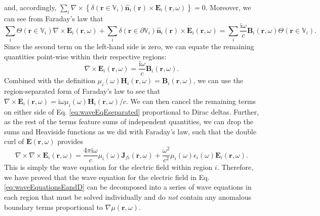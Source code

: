 \documentclass{article}
\begin{document}
and, accordingly, $\sum_i\nabla\times\left\{\delta(\mathbf{r}\in\mathbb{V}_i)\hat{\mathbf{n}}_i(\mathbf{r})\times\mathbf{E}_i(\mathbf{r},\omega)\right\} = 0$. Moreover, we can see from Faraday's law that
\begin{equation}
\sum_i\Theta(\mathbf{r}\in\mathbb{V}_i)\nabla\times\mathbf{E}_i(\mathbf{r},\omega) + \sum_i\delta(\mathbf{r}\in\partial\mathbb{V}_i)\hat{\mathbf{n}}_i(\mathbf{r})\times\mathbf{E}_i(\mathbf{r},\omega) = \sum_i\frac{\mathrm{i}\omega}{c}\mathbf{B}_i(\mathbf{r},\omega)\Theta(\mathbf{r}\in\mathbb{V}_i).
\end{equation}
Since the second term on the left-hand side is zero, we can equate the remaining quantities point-wise within their respective regions:
\begin{equation}
\nabla\times\mathbf{E}_i(\mathbf{r},\omega) = \frac{\mathrm{i}\omega}{c}\mathbf{B}_i(\mathbf{r},\omega).
\end{equation}
\sloppy Combined with the definition $\mu_i(\omega)\mathbf{H}_i(\mathbf{r},\omega) = \mathbf{B}_i(\mathbf{r},\omega)$, we can use the region-separated form of Faraday's law to see that $\nabla\times\mathbf{E}_i(\mathbf{r},\omega) = \mathrm{i}\omega\mu_i(\omega)\mathbf{H}_i(\mathbf{r},\omega)/c$. We can then cancel the remaining terms on either side of Eq. \eqref{eq:waveEqEseparated} proportional to Dirac deltas. Further, as the rest of the terms feature sums of independent quantities, we can drop the sums and Heaviside functions as we did with Faraday's law, such that the double curl of $\mathbf{E}(\mathbf{r},\omega)$ provides
\begin{equation}\label{eq:waveEqEseparated2}
\nabla\times\nabla\times\mathbf{E}_i(\mathbf{r},\omega) = \frac{4\pi\mathrm{i}\omega}{c}\mu_i(\omega)\mathbf{J}_{fi}(\mathbf{r},\omega) + \frac{\omega^2}{c^2}\mu_i(\omega)\epsilon_i(\omega)\mathbf{E}_i(\mathbf{r},\omega).
\end{equation}
This is simply the wave equation for the electric field within region $i$. Therefore, we have proved that the wave equation for the electric field in Eq. \eqref{eq:waveEquationsEandD} can be decomposed into a series of wave equations in each region that must be solved individually and do \textit{not} contain any anomalous boundary terms proportional to $\nabla\mu(\mathbf{r},\omega)$.
\end{document}
